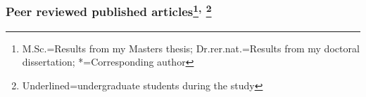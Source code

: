 \documentclass[letter,10pt]{article}
\begin{document}




\subsubsection*{Peer reviewed published articles\footnote{M.Sc.=Results from my Masters thesis; Dr.rer.nat.=Results from my doctoral dissertation; *=Corresponding author}\textsuperscript{,} \footnote{Underlined=undergraduate students during the study}}%
\end{document}
